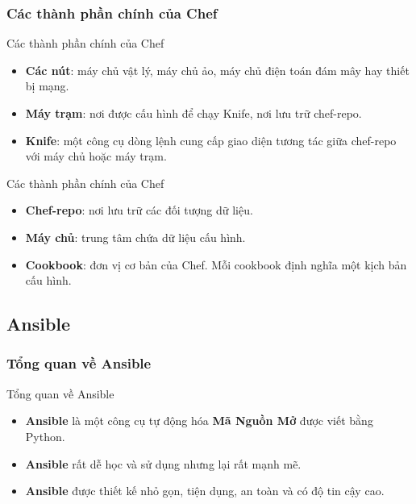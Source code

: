 \documentclass[14pt]{beamer}
\begin{document}
\subsubsection*{Các thành phần chính của Chef}
\begin{frame}{Các thành phần chính của Chef}
  \begin{itemize}
    \item \textbf{Các nút}: máy chủ vật lý, máy chủ ảo, máy chủ điện toán đám mây hay thiết bị mạng.
    \pause
    \item \textbf{Máy trạm}: nơi được cấu hình để chạy Knife, nơi lưu trữ chef-repo.
    \pause
    \item \textbf{Knife}: một công cụ dòng lệnh cung cấp giao diện tương tác giữa chef-repo với máy chủ hoặc máy trạm.
  \end{itemize}
\end{frame}


\begin{frame}{Các thành phần chính của Chef}
\renewcommand{\baselinestretch}{1.50}\normalsize
  \begin{itemize}
    \item \textbf{Chef-repo}: nơi lưu trữ các đối tượng dữ liệu.
    \pause
    \item \textbf{Máy chủ}: trung tâm chứa dữ liệu cấu hình.
    \pause
    \item \textbf{Cookbook}: đơn vị cơ bản của Chef. Mỗi cookbook định nghĩa một kịch bản cấu hình.
  \end{itemize}
\renewcommand{\baselinestretch}{1.0}\normalsize
\end{frame}

\subsection{Ansible}
\subsubsection*{Tổng quan về Ansible}

\begin{frame}{Tổng quan về Ansible}
\renewcommand{\baselinestretch}{1.50}\normalsize
  \begin{itemize}
    \item \textbf{Ansible} là một công cụ tự động hóa \textbf{Mã Nguồn Mở} được viết bằng Python.
    \pause
    \item \textbf{Ansible} rất dễ học và sử dụng nhưng lại rất mạnh mẽ.
    \pause
    \item \textbf{Ansible} được thiết kế nhỏ gọn, tiện dụng, an toàn và có độ tin cậy cao.
  \end{itemize}
\renewcommand{\baselinestretch}{1.0}\normalsize
\end{frame}
\end{document}
